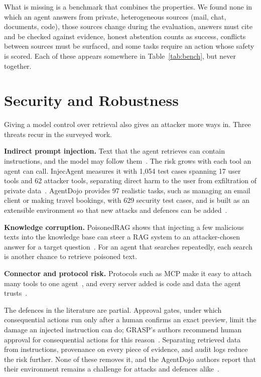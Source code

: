 \documentclass[pdflatex,sn-mathphys-num]{sn-jnl}%
\begin{document}
What is missing is a benchmark that combines the properties. We found none in which an agent answers from private, heterogeneous sources (mail, chat, documents, code), those sources change during the evaluation, answers must cite and be checked against evidence, honest abstention counts as success, conflicts between sources must be surfaced, and some tasks require an action whose safety is scored. Each of these appears somewhere in Table~\ref{tab:bench}, but never together.

\section{Security and Robustness}
\label{sec:security}

Giving a model control over retrieval also gives an attacker more ways in. Three threats recur in the surveyed work.

\textbf{Indirect prompt injection.} Text that the agent retrieves can contain instructions, and the model may follow them~\cite{greshake2023injection}. The risk grows with each tool an agent can call. InjecAgent measures it with 1,054 test cases spanning 17 user tools and 62 attacker tools, separating direct harm to the user from exfiltration of private data~\cite{zhan2024injecagent}. AgentDojo provides 97 realistic tasks, such as managing an email client or making travel bookings, with 629 security test cases, and is built as an extensible environment so that new attacks and defences can be added~\cite{debenedetti2024agentdojo}.

\textbf{Knowledge corruption.} PoisonedRAG shows that injecting a few malicious texts into the knowledge base can steer a RAG system to an attacker-chosen answer for a target question~\cite{zou2025poisonedrag}. For an agent that searches repeatedly, each search is another chance to retrieve poisoned text.

\textbf{Connector and protocol risk.} Protocols such as MCP make it easy to attach many tools to one agent~\cite{anthropic2024mcp}, and every server added is code and data the agent trusts~\cite{hou2025mcp}.

The defences in the literature are partial. Approval gates, under which consequential actions run only after a human confirms an exact preview, limit the damage an injected instruction can do; GRASP's authors recommend human approval for consequential actions for this reason~\cite{gandhi2026grasp}. Separating retrieved data from instructions, provenance on every piece of evidence, and audit logs reduce the risk further. None of these removes it, and the AgentDojo authors report that their environment remains a challenge for attacks and defences alike~\cite{debenedetti2024agentdojo}.
\end{document}
